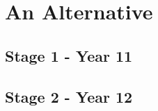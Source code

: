 \documentclass[11pt]{report}
\begin{document}
\chapter{An Alternative}
\section{Stage 1 - Year 11}




\section{Stage 2 - Year 12}
\end{document}
